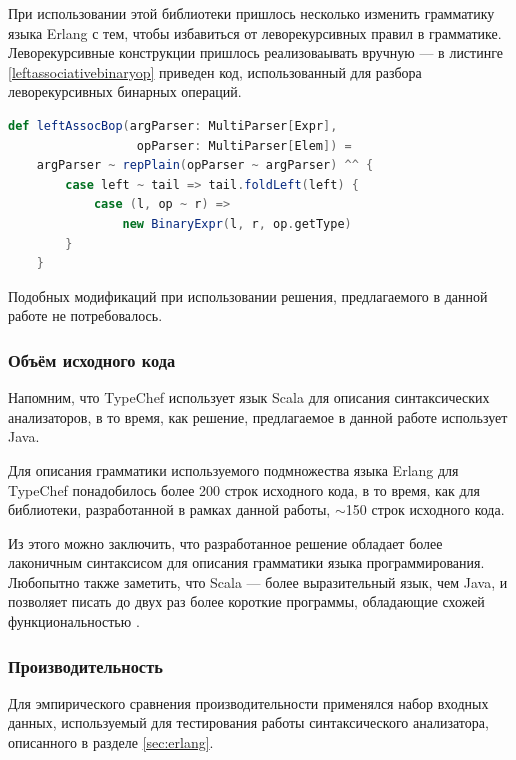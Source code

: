 При использовании этой библиотеки пришлось несколько изменить грамматику языка Erlang с тем, чтобы избавиться от леворекурсивных правил в грамматике. Леворекурсивные конструкции пришлось реализоваывать вручную --- в листинге \ref{leftassociativebinaryop} приведен код, использованный для разбора леворекурсивных бинарных операций. 

\begin{minipage}{\linewidth}
\begin{lstlisting}[caption={Реализация леворекурсивных конструкций в TypeChef},label=leftassociativebinaryop,language=Scala]
def leftAssocBop(argParser: MultiParser[Expr], 
                  opParser: MultiParser[Elem]) =
	argParser ~ repPlain(opParser ~ argParser) ^^ {
		case left ~ tail => tail.foldLeft(left) {
			case (l, op ~ r) => 
				new BinaryExpr(l, r, op.getType)
		}
	}
\end{lstlisting}
\end{minipage}

Подобных модификаций при использовании решения, предлагаемого в данной работе не потребовалось.

\subsubsection{Объём исходного кода}

Напомним, что TypeChef использует язык Scala для описания синтаксических анализаторов, в то время, как решение, предлагаемое в данной работе использует Java.

Для описания грамматики используемого подмножества языка Erlang для TypeChef понадобилось более 200 строк исходного кода, в то время, как для библиотеки, разработанной в рамках данной работы, $\sim$150 строк исходного кода.

Из этого можно заключить, что разработанное решение обладает более лаконичным синтаксисом для описания грамматики языка программирования. Любопытно также заметить, что Scala --- более выразительный язык, чем Java, и позволяет писать до двух раз более короткие программы, обладающие схожей функциональностью \cite{scalavsjava}.


\subsubsection{Производительность}

Для эмпирического сравнения производительности применялся набор входных данных, используемый для тестирования работы синтаксического анализатора, описанного в разделе \ref{sec:erlang}.

